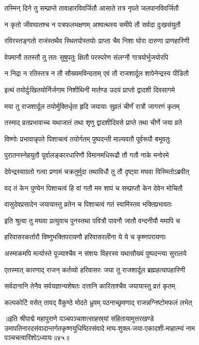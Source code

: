 \twolineshloka
{तस्मिन् दिने तु सम्प्राप्ते तावाहारविवर्जितौ}
{आसाते तत्र नृपते जलपानविवर्जितौ}%

\twolineshloka
{न कृतो जीवघातश्च न पत्रफलभक्षणम्}
{अश्वत्थस्य समीपे तौ सर्वदा दुःखसंयुतौ}%

\twolineshloka
{रविरस्तङ्गतो राजंस्तथैव स्थितयोस्तयोः}
{प्राप्ता चैव निशा घोरा दारुणा प्राणहारिणी}%

\twolineshloka
{वेपमानौ ततस्तौ तु ततः सुषुपतुः क्षितौ}
{परस्परेण संलग्नौ गात्रयोर्भुजयोरपि}%

\twolineshloka
{न निद्रा न रतिस्तत्र न तौ सौख्यमविन्दताम्}
{एवं तौ राजशार्दूल शापेनेन्द्रस्य पीडितौ}%

\twolineshloka
{इत्थं तयोर्दुःखितयोर्निर्जगाम निशीथिनी}
{मार्तण्ड उदयं प्राप्तो द्वादशी दिवसागमे}%

\twolineshloka
{मया तु राजशार्दूल तयोर्मुक्तिर्धृता हृदि}
{जयायाः सुव्रतं चीर्णं रात्रौ जागरणं कृतम्}%

\twolineshloka
{तस्माद् व्रतप्रभावाच्च यथाजातं तथा शृणु}
{द्वादशीदिवसे प्राप्ते तथा चीर्णे जया व्रते}%

\twolineshloka
{विष्णोः प्रभावान्नृपते पिशाचत्वं तयोर्गतम्}
{पुष्पदन्ती माल्यवतौ पूर्वरूपौ बभूवतुः}%

\twolineshloka
{पुरातनस्नेहयुतौ  पूर्वालङ्कारधारिणौ}
{विमानमधिरूढौ तौ गतौ नाके मनोरमे}%

\twolineshloka
{देवेन्द्रस्याग्रतो गत्वा प्रणामं चक्रतुर्मुदा}
{तथाविधौ तु तौ दृष्ट्वा मघवा विस्मितोऽब्रवीत्}%


\twolineshloka
{वद तं केन पुण्येन पिशाचत्वं हि वां गतौ}
{मम शापं च सम्प्राप्तौ केन देवेन मोचितौ}%


\twolineshloka
{वासुदेवप्रसादेन जयायास्तु व्रतेन च}
{पिशाचत्वं गतं स्वामिंस्तव भक्तिप्रभावतः}%

\twolineshloka
{इति श्रुत्वा तु मघवा प्रत्युवाच पुनस्तथा}
{पवित्रौ पावनौ जातौ वन्दनीयौ ममापि च}%

\twolineshloka
{हरिवासरकर्तारौ विष्णुभक्तिपरायणौ}
{हरिवासरलीना ये ये च कृष्णपरायणाः}%

\twolineshloka
{अस्माकमपि मर्त्यास्ते पूज्याश्चैव न संशयः}
{विहरस्व यथासौख्यं पुष्पदन्त्या सुरालये}%


\twolineshloka
{एतस्मात् कारणाद् राजन् कर्तव्यो हरिवासरः}
{जया तु राजशार्दूल ब्रह्महत्यापहारिणी}%

\twolineshloka
{सर्वदानानि तेनैव सर्वयज्ञान्यशेषतः}
{दत्तानि कारिताश्चैव जयायास्तु व्रतं कृतम्}%

\twolineshloka
{कल्पकोटिं वसेत् तावद् वैकुण्ठे मोदते ध्रुवम्}
{पठनाच्छ्रवणाद् राजन्नग्निष्टोमफलं लभेत्}%

॥इति श्रीपाद्मे महापुराणे पञ्चपञ्चाशत्साहस्र्यां संहितायामुत्तरखण्डे उमापतिनारदसंवादान्तर्गतकृष्णयुधिष्ठिरसंवादे माघ-शुक्ल-जया-एकादशी-माहात्म्यं नाम पञ्चचत्वारिंशोऽध्यायः॥४५॥

\genMangalaShloka

\hyperref[sec:ekadashi_mahatmyam_padma_puranam]{\closesub}
\clearpage

